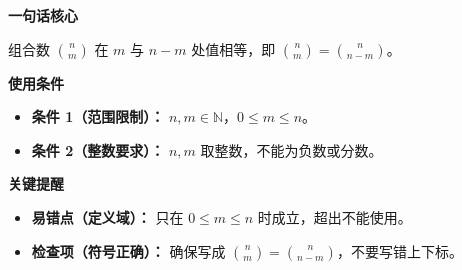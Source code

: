 \begin{summarybox}
	\textbf{\textcolor{CSummary}{一句话核心}}

	组合数 $\binom{n}{m}$ 在 $m$ 与 $n-m$ 处值相等，即 $\binom{n}{m}=\binom{n}{n-m}$。

	\medskip
	\textbf{\textcolor{CSummary}{使用条件}}
	\begin{itemize}[leftmargin=*, itemsep=0.5em, topsep=0.4em]
		\item \textbf{条件 1（范围限制）：} $n,m\in\mathbb{N}$，$0\le m\le n$。
		\item \textbf{条件 2（整数要求）：} $n,m$ 取整数，不能为负数或分数。
	\end{itemize}

	\medskip
	\textbf{\textcolor{CSummary}{关键提醒}}
	\begin{itemize}[leftmargin=*, itemsep=0.5em, topsep=0.4em]
		\item \textbf{易错点（定义域）：} 只在 $0\le m\le n$ 时成立，超出不能使用。
		\item \textbf{检查项（符号正确）：} 确保写成 $\binom{n}{m}=\binom{n}{n-m}$，不要写错上下标。
	\end{itemize}
\end{summarybox}
